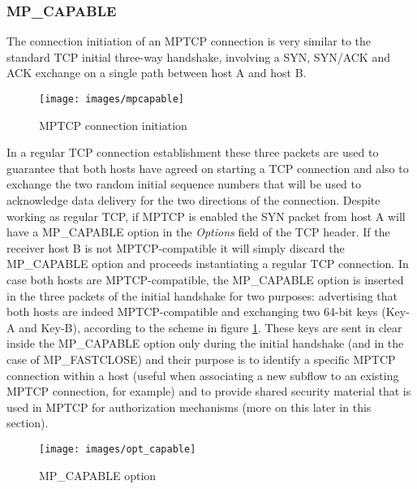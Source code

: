 \subsubsection{MP\_CAPABLE}
The connection initiation of an MPTCP connection is very similar to the standard TCP initial three-way handshake, involving a SYN, SYN/ACK and ACK exchange on a single path between host A and host B. 

\begin{figure}[!htb]
\centering
\texttt{[image: images/mpcapable]}
\caption{MPTCP connection initiation}
\label{fig:mpcapable}
\end{figure}

In a regular TCP connection establishment these three packets are used to guarantee that both hosts have agreed on starting a TCP connection and also to exchange the two random initial sequence numbers that will be used to acknowledge data delivery for the two directions of the connection. Despite working as regular TCP, if MPTCP is enabled the SYN packet from host A will have a MP\_CAPABLE option in the \textit{Options} field of the TCP header. If the receiver host B is not MPTCP-compatible it will simply discard the MP\_CAPABLE option and proceeds instantiating a regular TCP connection.
In case both hosts are MPTCP-compatible, the MP\_CAPABLE option is inserted in the three packets of the initial handshake for two purposes: advertising that both hosts are indeed MPTCP-compatible and exchanging two 64-bit keys (Key-A and Key-B), according to the scheme in figure \ref{fig:mpcapable}.
These keys are sent in clear inside the MP\_CAPABLE option only during the initial handshake (and in the case of MP\_FASTCLOSE) and their purpose is to identify a specific MPTCP connection within a host (useful when associating a new subflow to an existing MPTCP connection, for example) and to provide shared security material that is used in MPTCP for authorization mechanisms (more on this later in this section). 

\begin{figure}[!htb]
\centering
\texttt{[image: images/opt\_capable]}
\caption{MP\_CAPABLE option}
\label{fig:opt_capable}
\end{figure}

